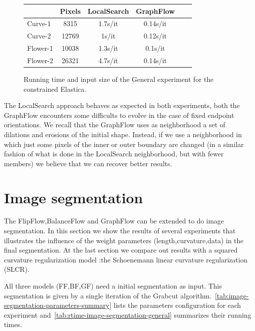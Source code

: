 \begin{figure}
\center
\captionsetup{type=table}
\begin{tabular}{|l|c|c|c|c|c|}
\hline
& Pixels & LocalSearch & GraphFlow \\
\hline
Curve-1 & 8315 & 1.7s/it & 0.14s/it\\
Curve-2 & 12769 & 1s/it & 0.12s/it\\
Flower-1  & 10038 & 1.3s/it & 0.1s/it \\
Flower-2 & 26321 & 4.7s/it & 0.14s/it\\
\hline
\end{tabular}
\caption{Running time and input size of the General experiment for the constrained Elastica.}
\label{tab:rtime-constrained-elastica-general} 
\end{figure}


The LocalSearch approach behaves as expected in both experiments, both the GraphFlow encounters some difficults to evolve in the case of fixed endpoint orientations. We recall that the GraphFlow uses as neighborhood a set of dilations and erosions of the initial shape. Instead, if we use a neighborhood in which just some pixels of the inner or outer boundary are changed (in a similar fashion of what is done in the LocalSearch neighborhood, but with fewer members) we believe that we can recover better results.

\section{Image segmentation}

The FlipFlow,BalanceFlow and GraphFlow can be extended to do image segmentation. In this section we show the results of several experiments that illustrates the influence of the weight parameters (length,curvature,data) in the final segmentation. At the last section we compare out results with a squared curvature regularization model :the Schoenemann linear curvature regularization (SLCR). 

All three models (FF,BF,GF) need a initial segmentation as input. This segmentation is given by a single iteration of the Grabcut algorithm.~\cref{tab:image-segmentation-parameters-summary} lists the parameters configuration for each experiment and~\cref{tab:rtime-image-segmentation-general} summarizes their running times. 

